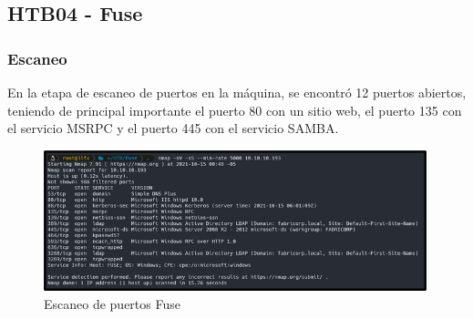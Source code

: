\subsection{HTB04 - Fuse}
\subsubsection{Escaneo}
En la etapa de escaneo de puertos en la máquina, se encontró 12 puertos abiertos, teniendo de principal importante el puerto 80 con un sitio web, el puerto 135 con el servicio MSRPC y el puerto 445 con el servicio SAMBA.
\begin{figure}[H]
    \centering
    \includegraphics[width=0.99\textwidth]{imagenes/scanfuse.png}
    \caption{Escaneo de puertos Fuse}
\end{figure}
